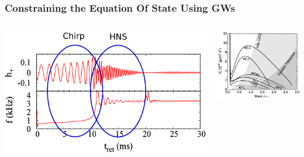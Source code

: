 



\begin{frame}
\frametitle{Constraining the Equation Of State Using GWs}
\begin{columns}
\begin{minipage}[c][0.4\textheight][c]{\linewidth}
  \centering
\includegraphics[width=\textwidth]{pictures/shibata2.pdf}
\end{minipage}
\begin{minipage}[c][0.4\textheight][c]{\linewidth}
  \centering
 \includegraphics[width=.8\textwidth]{pictures/lambda.pdf}\\

\end{minipage}
\end{columns}
\end{frame}
